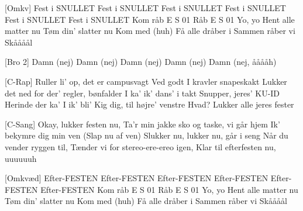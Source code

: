 \documentclass[a4paper,11pt]{article}
\begin{document}
\begin{song}
    [Omkv] Fest i SNULLET
Fest i SNULLET
Fest i SNULLET
Fest i SNULLET
Fest i SNULLET
Fest i SNULLET
Kom råb E S 01
Råb E S 01
Yo, yo
Hent alle matter nu
Tøm din' slatter nu
Kom med (huh)
Få alle dråber i
Sammen råber vi
Skåååål

[Bro 2] Damn (nej)
Damn (nej)
Damn (nej)
Damn (nej)
Damn (nej, ååååh)

    [C-Rap] Ruller li' op, det er campusvagt
Ved godt I kravler snapeskakt
Lukker det ned for der' regler, bønfalder 
I ka' ik' dans' i takt
Snupper, jeres' KU-ID
Herinde der ka' I ik' bli'
Kig dig, til højre' venstre
Hvad?
Lukker alle jeres fester

[C-Sang] Okay, lukker festen nu,
Ta'r min jakke sko og taske, vi går hjem 
Ik' bekymre dig min ven 
(Slap nu af ven) 
Slukker nu, lukker nu, går i seng
Når du vender ryggen til, 
Tænder vi for stereo-ere-ereo igen, 
Klar til efterfesten nu, uuuuuuh

[Omkvæd] Efter-FESTEN
Efter-FESTEN
Efter-FESTEN
Efter-FESTEN
Efter-FESTEN
Efter-FESTEN
Kom råb E S 01
Råb E S 01
Yo, yo
Hent alle matter nu
Tøm din' slatter nu
Kom med (huh)
Få alle dråber i
Sammen råber vi
Skåååål
\end{song}
\end{document}

